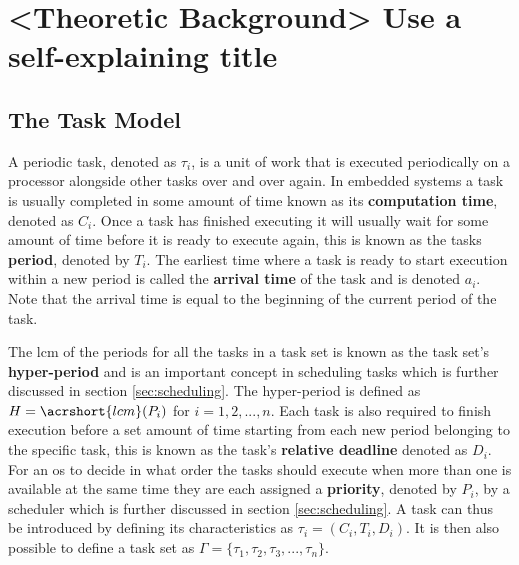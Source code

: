 \documentclass{kththesis}
\begin{document}

\chapter{<Theoretic Background> Use a self-explaining title}



\section{The Task Model} \label{sec:the_task_model}

A periodic task, denoted as $\tau_i$, is a unit of work that is executed periodically on a processor
alongside other tasks over and over again. In embedded systems a task is usually completed in some
amount of time known as its \textbf{computation time}, denoted as $C_i$. Once a task has finished
executing it will usually wait for some amount of time before it is ready to execute again, this is
known as the tasks \textbf{period}, denoted by $T_i$. The earliest time where a task is ready to
start execution within a new period is called the \textbf{arrival time} of the task and is denoted $
a_i $. Note that the arrival time is equal to the beginning of the current period of the task.

The \acrshort{lcm} of the periods for all the tasks in a task set is known as the task set's
\textbf{hyper-period} and is an important concept in scheduling tasks which is further discussed
in section \ref{sec:scheduling}. The hyper-period is defined as $H = \acrshort{lcm}(P_i)$ for $i =
1, 2, ..., n$. Each task is also required to finish execution before a set amount of time starting
from each new period belonging to the specific task, this is known as the task's \textbf{relative
deadline} denoted as $D_i$. For an \acrshort{os} to decide in what order the tasks should execute
when more than one is available at the same time they are each assigned a \textbf{priority}, denoted
by $P_i$, by a scheduler which is further discussed in section \ref{sec:scheduling}. A task can thus
be introduced by defining its characteristics as $\tau_i = (C_i, T_i, D_i)$. It is then also possible to
define a task set as $ \Gamma = \{\tau_1, \tau_2, \tau_3, ..., \tau_n\} $.
\end{document}
